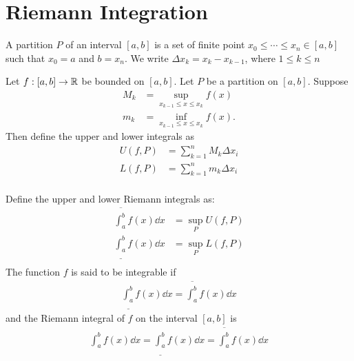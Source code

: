 \section{Riemann Integration}
\begin{definition}
  A partition $P$ of an interval $[a,b]$ is a set of finite point $x_0\leq \cdots \leq x_n \in [a,b]$ such that $x_0 =a$ and $b=x_n$. We write $\Delta x_k = x_{k} - x_{k-1}$, where $1\leq k\leq n$
\end{definition}
\begin{definition}
  Let $f:[a,b]\to \mathbb{R}$ be bounded on $[a,b]$. Let $P$ be a partition on $[a,b]$. Suppose
  \begin{align*}
    M_k &= \sup_{x_{k-1} \leq x \leq x_k} f(x)\\
    m_k &= \inf_{x_{k-1} \leq x \leq x_k} f(x).
  \end{align*}
  Then define the upper and lower integrals as
  \begin{align*}
    U(f,P) &= \sum_{k=1}^{n} M_k \Delta x_i\\
    L(f,P) &= \sum_{k=1}^{n} m_k \Delta x_i\\
  \end{align*}
\end{definition}
\begin{definition}
  Define the upper and lower Riemann integrals as:
  \begin{align*}
    \overline{\int^{b}_{a}} f(x) \dd x &= \sup_{P} U(f,P)\\
    \underline{\int^{b}_{a}} f(x) \dd x &= \sup_{P} L(f,P)\\
  \end{align*}
  The function $f$ is said to be integrable if
  \begin{align*}
    \underline{\int^{b}_{a}} f(x) \dd x = \overline{\int^{b}_{a}} f(x) \dd x
  \end{align*}
  and the Riemann integral of $f$ on the interval $[a,b]$ is
  \begin{align*}
    \int^b_a f(x) \dd x = \underline{\int^{b}_{a}} f(x) \dd x = \overline{\int^{b}_{a}} f(x) \dd x
  \end{align*}
\end{definition}

